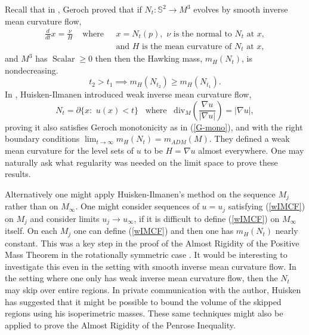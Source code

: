 \documentclass[12pt]{amsart}
\begin{document}
Recall that in \cite{Geroch-monotonicity}, Geroch  proved that if $N_t: \mathbb{S}^2 \to M^3$
evolves by smooth inverse mean curvature flow,
\begin{eqnarray}\label{IMCF}
\frac{d}{dt} x = \frac{\nu}{H}
&\textrm{ where }&\,\, x=N_t(p), \,\, \nu\textrm{ is the normal to } N_t
\textrm{ at } x,\\
&& \textrm{ and } H \textrm{ is the mean curvature of }
N_t \textrm{ at } x,
\end{eqnarray}
and $M^3$ has ${\operatorname{Scalar}} \ge 0$ then
then the Hawking mass, $m_H(N_t)$, is nondecreasing. 
\begin{equation} \label{G-mono}
t_2 > t_1 \implies m_H(N_{t_2}) \ge m_H(N_{t_1}).
\end{equation}
In \cite{Huisken-Ilmanen},
Huisken-Ilmanen introduced weak inverse mean curvature flow,
\begin{equation}\label{wIMCF}
N_t=\partial \{x:\,\, u(x)<t\} \,\,\,\textrm{ where } \,\,\,
\textrm{div}_M\left(\frac{\nabla u}{|\nabla u|} \right)=|\nabla u|,
\end{equation}
proving it also satisfies Geroch monotonicity 
as in (\ref{G-mono}), 
 and 
with the right boundary conditions 
$\lim_{t\to\infty} m_H(N_t)= m_{ADM}(M)$.   They defined a weak
mean curvature for the level sets of $u$ to be $H=\nabla u$ almost
everywhere.   One may naturally ask what regularity was needed on
the limit space to prove these results.  

Alternatively one might apply Huisken-Ilmanen's method on the sequence
$M_j$ rather than on $M_\infty$.  One might consider sequences 
of $u=u_j$ satisfying (\ref{wIMCF}) on $M_j$
and consider limits $u_j \to u_\infty$, if it is difficult to define 
(\ref{wIMCF}) on $M_\infty$ itself.   On each $M_j$ one can define (\ref{wIMCF})
and then one has $m_H(N_t)$ nearly constant.  This was a key step in the proof of
the Almost Rigidity of the Positive Mass Theorem in the rotationally
symmetric case \cite{LeeSormani1}.  It would be interesting to investigate this
even in
the setting with smooth inverse mean curvature flow.  In the setting where
one only has weak inverse mean curvature flow, then the $N_t$ may
skip over entire regions.  In private communication with the author,
Huisken has suggested that it
might be possible to bound the volume of the skipped regions using
his isoperimetric masses.   These same techniques might also be applied to
prove the Almost Rigidity of the Penrose Inequality.
\end{document}
